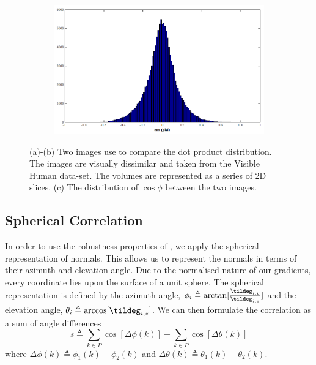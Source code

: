\begin{figure}[h!]
\begin{subfigure}[b]{0.45\textwidth}
                \centering
                \includegraphics[width=\textwidth]{images/dot_product_hist}
                \subcaption{}
                \label{fig:dot-product-hist}
        \end{subfigure}
        \caption{(a)-(b) Two images use to compare the dot product distribution. The images are visually dissimilar and taken from the Visible Human data-set. The volumes are represented as a series of 2D slices. (c) The distribution of $\cos \phi$ between the two images.}
        \label{fig:dot-product-distribution}
\end{figure}

\subsection{Spherical Correlation}\label{subsec:spherical-corr}
In order to use the robustness properties of \cite{RefWorks:6}, we apply the spherical representation of normals. This allows us to represent the normals in terms of their azimuth and elevation angle. Due to the normalised nature of our gradients, every coordinate lies upon the surface of a unit sphere. The spherical representation is defined by the azimuth angle, $\phi_i \triangleq \arctan [\frac{\tildeg_{i,y}}{\tildeg_{i,x}}]$ and the elevation angle, $\theta_i \triangleq \arccos [\tildeg_{i,z}]$. We can then formulate the correlation as a sum of angle differences
\begin{equation}\label{eq:spherical-cosine}
    s \triangleq \sum_{k \in P} \cos [\Delta \phi (k)] + \sum_{k \in P} \cos [\Delta \theta (k)]
\end{equation}
where $\Delta \phi (k) \triangleq \phi_1 (k) - \phi_2 (k)$ and $\Delta \theta (k) \triangleq \theta_1 (k) - \theta_2 (k)$.

